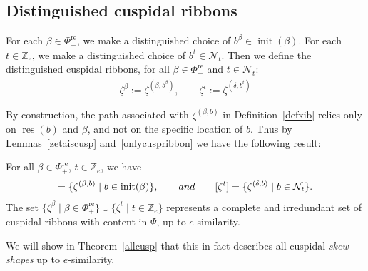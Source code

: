 \documentclass[Unicode,ALCO]{cedram}
\newcommand{\res}{\operatorname{res}}
\newcommand{\Z}{\mathbb{Z}}
\newcommand{\N}{\mathcal{N}}
\newcommand{\0}{{\bar 0}}
\newcommand{\ZZ}{{\mathbb Z}}
\def\init{{\operatorname{init}}}
\def\re{{\mathrm{re}}}
\begin{document}
\subsection{Distinguished cuspidal ribbons}
For each \(\beta \in \Phi_+^\re\), we make a distinguished choice of \(b^\beta \in \init(\beta)\). For each \(t \in \Z_e\), we make a distinguished choice of \(b^t \in \N_t\). Then we define the distinguished cuspidal ribbons, for all \(\beta \in \Phi_+^\re\) and \(t \in \N_t\):
\begin{align*}
\zeta^\beta := \zeta^{(\beta, b^{\beta})}, \qquad \zeta^t := \zeta^{(\delta, b^t)}
\end{align*}

By construction, the path associated with \(\zeta^{(\beta, b)}\) in Definition~\ref{defxib} relies only on \(\res(b)\) and \(\beta\), and not on the specific location of \(b\). Thus by Lemmas~\ref{zetaiscusp} and~\ref{onlycuspribbon} we have the following result:

\begin{prop}\label{allcusprib}
For all \(\beta \in \Phi_+^\re\), \(t \in \ZZ_e\), we have
\begin{align*}
[\zeta^{\beta}] = \{\zeta^{(\beta,b)} \mid b \in \init(\beta)\},
\qquad
\textup{and}
\qquad
[\zeta^{t}] = \{\zeta^{(\delta,b)} \mid b \in \N_t\}.
\end{align*}
The set \(\{\zeta^{\beta} \mid \beta \in \Phi_+^\re\} \cup \{\zeta^t \mid t \in \Z_e\}\) represents a complete and irredundant set of cuspidal ribbons with content in \(\Psi\), up to \(e\)-similarity.
\end{prop}

We will show in Theorem~\ref{allcusp} that this in fact describes all cuspidal {\em skew shapes} up to \(e\)-similarity.
\end{document}
